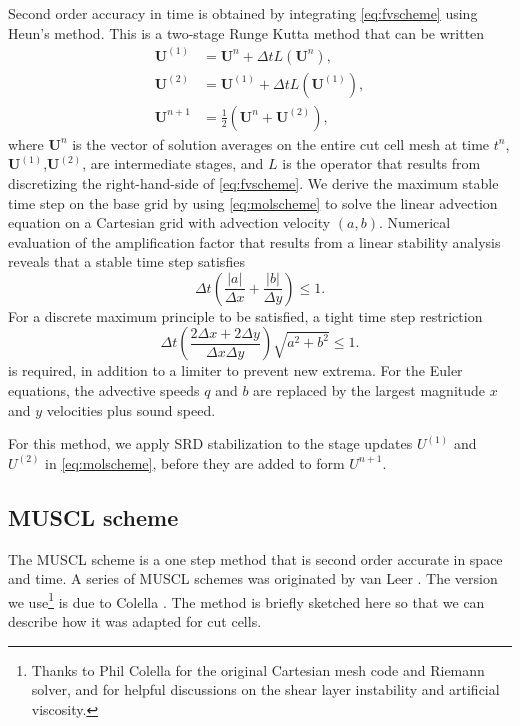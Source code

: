 Second order accuracy in time is obtained by integrating \eqref{eq:fvscheme} using Heun's method.  This is a two-stage Runge Kutta method that can be written
\begin{equation}\label{eq:molscheme}
\begin{aligned}
	\mathbf{U}^{(1)} &= \mathbf{U}^{n} + \Delta t L(\mathbf{U}^n), \\
	\mathbf{U}^{(2)} &= \mathbf{U}^{(1)} + \Delta t L(\mathbf{U}^{(1)}), \\
	\mathbf{U}^{n+1} &= \frac{1}{2}( \mathbf{U}^{n} + \mathbf{U}^{(2)} ) ,	
\end{aligned}
\end{equation}
where $\mathbf{U}^{n}$ is the vector of solution averages on the entire cut cell mesh at time $t^n$,
$\mathbf{U}^{(1)}$,$\mathbf{U}^{(2)}$, are intermediate stages, and $L$ is the operator that results
from discretizing the right-hand-side of \eqref{eq:fvscheme}.
We derive the maximum stable time step on the base grid by using \eqref{eq:molscheme} to solve the linear advection equation on a Cartesian grid with advection velocity $(a,b)$.
Numerical evaluation of the amplification factor that results from a linear stability analysis reveals that a stable time step satisfies
\begin{equation}\label{eq:vn1}
\Delta t   \left( \frac{|a|}{\Delta x} + \frac{|b|}{\Delta y} \right)\leq 1.
\end{equation}
For a discrete maximum principle to be satisfied, a tight time step restriction 
\begin{equation}
\Delta t  \left( \frac{2\Delta x + 2 \Delta y}{\Delta x \Delta y} \right) \sqrt{a^2 + b^2}\leq 1 .
\end{equation}
is required, in addition to a limiter to prevent new extrema.
For the Euler equations, the advective speeds $q$ and $b$ are replaced
by the largest magnitude $x$ and $y$ velocities  plus sound speed.

For this method, we apply SRD stabilization to the stage updates
$U^{(1)}$ and $U^{(2)}$ in \eqref{eq:molscheme}, before they are added to form $U^{n+1}$.

\subsection{MUSCL scheme} \label{sec:muscl}
The MUSCL scheme is a one step method that is second order accurate in
space and time. A series of MUSCL schemes  was originated by van Leer 
\cite{vanleer:muscl}. The version we use\footnote{Thanks to Phil 
Colella for the original Cartesian mesh code and Riemann solver,  and for helpful discussions on the shear
layer instability and artificial viscosity.}
is due to Colella \cite{Colella:Unsplit}.
The method is briefly sketched here so that we can describe how it was
adapted for cut cells. 

